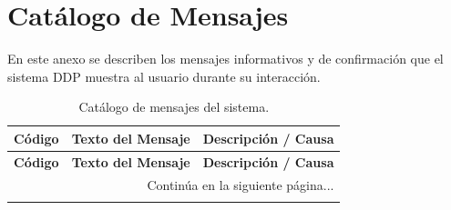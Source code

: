 
\chapter{Catálogo de Mensajes}
\label{anexo:mensajes}

En este anexo se describen los mensajes informativos y de confirmación que el sistema DDP muestra al usuario durante su interacción.

\small
\begin{longtable}{|p{2cm}|p{6cm}|p{6cm}|}
    \caption{Catálogo de mensajes del sistema.} \label{tab:mensajes} \\
    
    \hline
    \rowcolor[HTML]{EFEFEF} 
    \textbf{Código} & \textbf{Texto del Mensaje} & \textbf{Descripción / Causa} \\ \hline
    \endfirsthead %
    
    \hline
    \rowcolor[HTML]{EFEFEF} 
    \textbf{Código} & \textbf{Texto del Mensaje} & \textbf{Descripción / Causa} \\ \hline
    \endhead %
    
    \hline
    \multicolumn{3}{r}{{Continúa en la siguiente página...}} \\
    \endfoot %
    
    \hline
    \endlastfoot %


\end{longtable}

